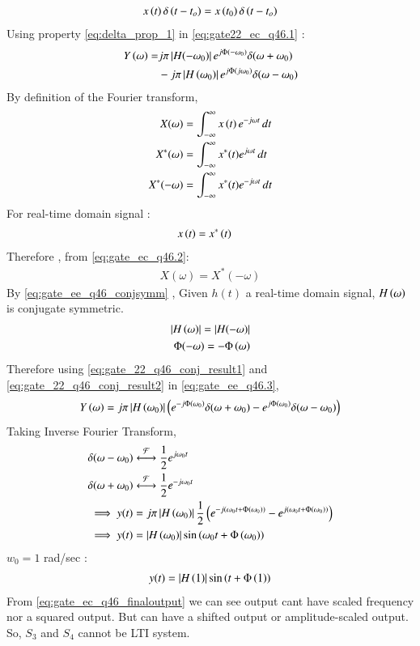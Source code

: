 \documentclass[journal,12pt,twocolumn]{IEEEtran}
\theoremstyle{remark}
\begin{document}
\begin{align}
    x\left(t\right)\delta\left(t-t_{o}\right) = x\left(t_{0}\right)\delta\left(t-t_{o}\right) \label{eq:delta_prop_1}
\end{align}
Using property \eqref{eq:delta_prop_1} in \eqref{eq:gate22_ec_q46.1} :
\begin{align}
    Y\left(\omega\right)=&j\pi \left\vert H(-\omega_0)\right\vert e^{j\Phi(-\omega_0)}\delta(\omega+\omega_0)\label{eq:gate_ee_q46.3} \\&- j\pi \left\vert H\left(\omega_0\right)\right\vert e^{j\Phi(j\omega_0)}\delta(\omega-\omega_0) \notag 
\end{align}
By definition of the Fourier transform,
\begin{align}
    X(\omega) &= \int_{-\infty}^{\infty} x\left(t\right)e^{-j\omega t} \,dt \\
    X^*(\omega) &= \int_{-\infty}^{\infty} x^*(t)e^{j\omega t} \,dt \\
    X^*(-\omega) &= \int_{-\infty}^{\infty} x^*(t)e^{-j\omega t} \,dt\label{eq:gate_ec_q46.2}
\end{align}
For real-time domain signal :
\begin{align}
    x\left(t\right) &= x^*\left(t\right)
\end{align}
Therefore , from \eqref{eq:gate_ec_q46.2}:
\begin{align}
    X(\omega) =  X^*(-\omega) \label{eq:gate_ee_q46_conjsymm}
\end{align}
By \eqref{eq:gate_ee_q46_conjsymm} , Given $h(t)$ a real-time domain signal, $H\left(\omega\right)$ is conjugate symmetric.
\begin{align}
    \left\vert H\left(\omega\right)\right\vert=\left\vert H(-\omega)\right\vert\label{eq:gate_22_q46_conj_result1}\\
    \Phi(-\omega)=-\Phi\left(\omega\right)\label{eq:gate_22_q46_conj_result2}
\end{align}
Therefore using \eqref{eq:gate_22_q46_conj_result1} and \eqref{eq:gate_22_q46_conj_result2} in \eqref{eq:gate_ee_q46.3},
 \begin{align}
    Y\left(\omega\right)= j\pi \left\vert H\left(\omega_0\right)\right\vert\left(e^{-j\Phi\left(\omega_0\right)}\delta(\omega+\omega_0) - e^{j\Phi\left(\omega_0\right)}\delta(\omega-\omega_0)\right)
\end{align}
Taking Inverse Fourier Transform, 
\begin{align}
    &\delta(\omega-\omega_0) \system{F} \frac{1}{2}e^{j\omega_0t}\\
     &\delta(\omega+\omega_0) \system{F} \frac{1}{2}e^{-j\omega_0t}\\
    &\implies y(t)=j\pi \abs{H\brak{\omega_0}}\frac{1}{2}\brak{e^{-j\brak{\omega_0t+\Phi\brak{\omega_0}}}-e^{j\brak{\omega_0t+\Phi\brak{\omega_0}}}}\\
    &\implies y(t) =\abs{H\brak{\omega_0}}\sin{\brak{\omega_0t+\Phi\brak{\omega_0}}} 
\end{align}
$w_{0} = 1$ rad/sec :
\begin{align}
    y(t) =\left\vert H\left(1\right)\right\vert\sin{\ensuremath{\left(t+\Phi\left(1\right)\right)}} \label{eq:gate_ec_q46_finaloutput}
\end{align}
From \eqref{eq:gate_ec_q46_finaloutput} we can see output cant have scaled frequency nor a squared output. But can have a shifted output or amplitude-scaled output. \\

So, $S_{3}$ and $S_{4}$ cannot be LTI system.
\end{document}
